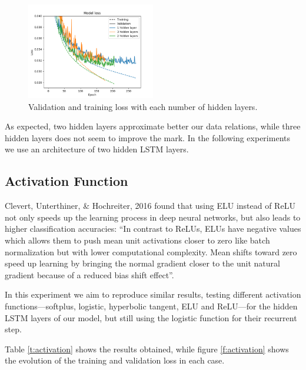 \documentclass[]{article}
\begin{document}
\begin{figure}[H]
	\centering
	\includegraphics[width=0.5\textwidth]{layers}
	\caption{Validation and training loss with each number of hidden layers.}
	\label{f:layers}
\end{figure}

As expected, two hidden layers approximate better our data relations, while three hidden layers does not seem to improve the mark. In the following experiments we use an architecture of two hidden LSTM layers.

\subsection{Activation Function}

Clevert, Unterthiner, \& Hochreiter, 2016 \cite{clevert2015fast} found that using ELU instead of ReLU not only speeds up the learning process in deep neural networks, but also leads to higher classification accuracies: ``In contrast to ReLUs, ELUs have negative values which allows them to push mean unit activations closer to zero like batch normalization but with lower computational complexity. Mean shifts toward zero speed up learning by bringing the normal gradient closer to the unit natural gradient because of a reduced bias shift effect''.

In this experiment we aim to reproduce similar results, testing different activation functions---softplus, logistic, hyperbolic tangent, ELU and ReLU---for the hidden LSTM layers of our model, but still using the logistic function for their recurrent step.

Table \ref{t:activation} shows the results obtained, while figure \ref{f:activation} shows the evolution of the training and validation loss in each case.
\end{document}
